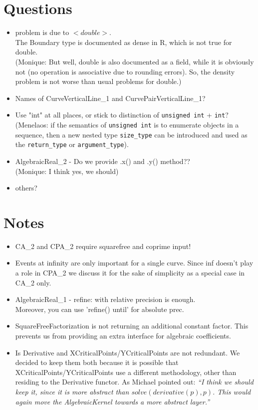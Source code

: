 \section{Questions}
\begin{itemize}
\item problem is due to $<double>$.\\
    The Boundary type is documented as dense in R, which is not true
    for double.\\ (Monique: But well, double is also documented as a
    field, while it is obviously not (no operation is associative
    due to rounding errors). So, the density problem is not worse
    than usual problems for double.)
 \item Names of CurveVerticalLine\_1 and CurvePairVerticalLine\_1?
 \item Use "int" at all places, or stick to distinction of \texttt{unsigned
   int} + \texttt{int}?
   (Menelaos: if the semantics of \texttt{unsigned int} is to enumerate
   objects in a sequence, then a new nested type \texttt{size\_type}
   can be introduced and used as the \texttt{return\_type} or
   \texttt{argument\_type}).
 \item AlgebraicReal\_2 - Do we provide .x() and .y() method??\\
     (Monique: I think yes, we should)
 \item others?
\end{itemize}


\section{Notes}
\begin{itemize}
 \item CA\_2 and CPA\_2 require squarefree and coprime input! 
 \item Events at infinity are only important for a single curve. Since
   inf doesn't play a role in CPA\_2 we discuss it for the sake of
   simplicity as a special case in CA\_2 only. 
\item AlgebraicReal\_1 - refine: with relative precision is enough. \\
      Moreover, you can use 'refine() until' for absolute prec.
\item SquareFreeFactorization is not returning an additional constant 
      factor. This prevents us from providing an extra interface for 
      algebraic coefficients.
 \item Is Derivative and XCriticalPoints/YCriticalPoints are not
   redundant. We decided to keep them both because it is possible that
   XCriticalPoints/YCriticalPoints use a different methodology, other
   than residing to the Derivative functor. As Michael pointed out:
   \emph{``I think we should keep it, since it is more abstract than
     $solve(derivative(p),p)$.  This would again move the {\em
       AlgebraicKernel} towards a more abstract layer.''}
\end{itemize}

